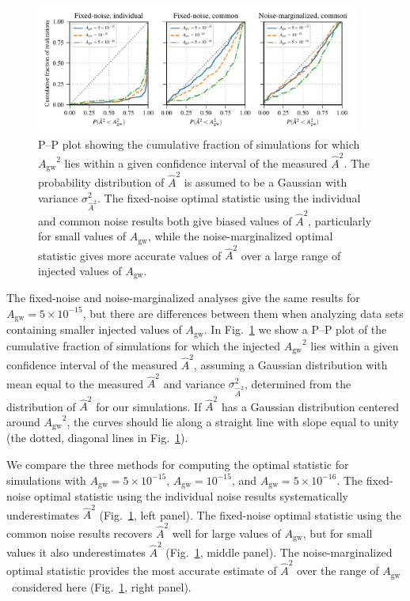 \documentclass[twocolumn,aps,prd,superscriptaddress]{revtex4-1}
\newcommand{\Agw}{\ensuremath{A_\mathrm{gw}}}
\begin{document}
\begin{figure}[tb]
	\includegraphics[width=0.95\textwidth]{plots/pp_plot.pdf}
	\caption{P--P plot showing the cumulative fraction of simulations for which $\Agw^2$ lies within 
			a given confidence interval of the measured $\hat{A}^2$. 
			The probability distribution of $\hat{A}^2$ is assumed to be a Gaussian 
			with variance $\sigma^2_{\hat{A}^2}$. 
			The fixed-noise optimal statistic using the individual and common noise results 
			both give biased values of $\hat{A}^2$, particularly for small values of \Agw, 
			while the noise-marginalized optimal statistic gives more accurate values of $\hat{A}^2$ 
			over a large range of injected values of \Agw.}
	\label{fig:os_compare}
\end{figure}

The fixed-noise and noise-marginalized analyses give the same results 
for $\Agw = 5\times10^{-15}$, 
but there are differences between them when analyzing data sets 
containing smaller injected values of $\Agw$. 
In Fig.~\ref{fig:os_compare} we show a P--P plot 
of the cumulative fraction of simulations for which the injected $\Agw^2$ lies within 
a given confidence interval of the measured $\hat{A}^2$, 
assuming a Gaussian distribution with mean equal to the measured $\hat{A}^2$ 
and variance $\sigma^2_{\hat{A}^2}$, 
determined from the distribution of $\hat{A}^2$ for our simulations. 
If $\hat{A}^2$ has a Gaussian distribution centered around $\Agw^2$, 
the curves should lie along a straight line with slope equal to unity (the dotted, diagonal lines in Fig.~\ref{fig:os_compare}).

We compare the three methods for computing the optimal statistic for 
simulations with $\Agw=5\times10^{-15}$, $\Agw=10^{-15}$, and $\Agw=5\times10^{-16}$. 
The fixed-noise optimal statistic using the individual noise results systematically underestimates $\hat{A}^2$ 
(Fig.~\ref{fig:os_compare}, left panel). 
The fixed-noise optimal statistic using the common noise results 
recovers $\hat{A}^2$ well for large values of $\Agw$, but for small values it also underestimates $\hat{A}^2$ 
(Fig.~\ref{fig:os_compare}, middle panel). 
The noise-marginalized optimal statistic provides the most accurate estimate of $\hat{A}^2$ 
over the range of \Agw\ considered here (Fig.~\ref{fig:os_compare}, right panel).
\end{document}
